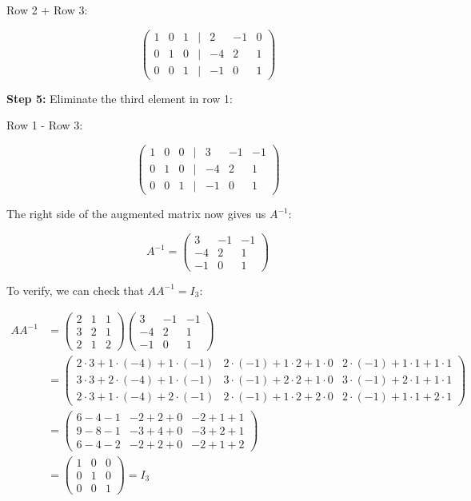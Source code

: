 Row 2 + Row 3:

\[
    \begin{pmatrix}
    1 & 0 & 1 & | & 2 & -1 & 0 \\
    0 & 1 & 0 & | & -4 & 2 & 1 \\
    0 & 0 & 1 & | & -1 & 0 & 1
    \end{pmatrix}
\]

\textbf{Step 5:} Eliminate the third element in row 1:

Row 1 - Row 3:

\[
    \begin{pmatrix}
    1 & 0 & 0 & | & 3 & -1 & -1 \\
    0 & 1 & 0 & | & -4 & 2 & 1 \\
    0 & 0 & 1 & | & -1 & 0 & 1
    \end{pmatrix}
\]

The right side of the augmented matrix now gives us \(A^{-1}\):

\[
    A^{-1} = 
    \begin{pmatrix}
    3 & -1 & -1 \\
    -4 & 2 & 1 \\
    -1 & 0 & 1
    \end{pmatrix}
\]

To verify, we can check that \(AA^{-1} = I_3\):

\begin{align*}
    AA^{-1} &= 
    \begin{pmatrix}
    2 & 1 & 1 \\
    3 & 2 & 1 \\
    2 & 1 & 2
    \end{pmatrix}
    \begin{pmatrix}
    3 & -1 & -1 \\
    -4 & 2 & 1 \\
    -1 & 0 & 1
    \end{pmatrix} \\
    &= 
    \begin{pmatrix}
    2 \cdot 3 + 1 \cdot (-4) + 1 \cdot (-1) & 2 \cdot (-1) + 1 \cdot 2 + 1 \cdot 0 & 2 \cdot (-1) + 1 \cdot 1 + 1 \cdot 1 \\
    3 \cdot 3 + 2 \cdot (-4) + 1 \cdot (-1) & 3 \cdot (-1) + 2 \cdot 2 + 1 \cdot 0 & 3 \cdot (-1) + 2 \cdot 1 + 1 \cdot 1 \\
    2 \cdot 3 + 1 \cdot (-4) + 2 \cdot (-1) & 2 \cdot (-1) + 1 \cdot 2 + 2 \cdot 0 & 2 \cdot (-1) + 1 \cdot 1 + 2 \cdot 1
    \end{pmatrix} \\
    &= 
    \begin{pmatrix}
    6 - 4 - 1 & -2 + 2 + 0 & -2 + 1 + 1 \\
    9 - 8 - 1 & -3 + 4 + 0 & -3 + 2 + 1 \\
    6 - 4 - 2 & -2 + 2 + 0 & -2 + 1 + 2
    \end{pmatrix} \\
    &= 
    \begin{pmatrix}
    1 & 0 & 0 \\
    0 & 1 & 0 \\
    0 & 0 & 1
    \end{pmatrix} = I_3
\end{align*}

